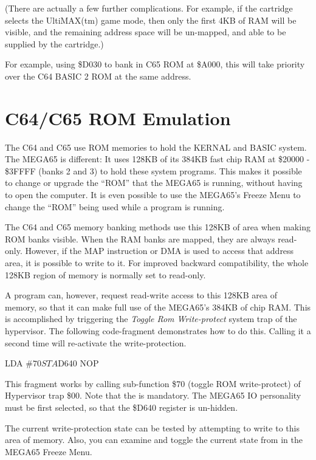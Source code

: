 (There are actually a few further complications. For example, if the
cartridge selects the UltiMAX(tm) game mode, then only the first 4KB
of RAM will be visible, and the remaining address space will be
un-mapped, and able to be supplied by the cartridge.)

For example, using \$D030 to bank in C65
ROM at \$A000, this will take priority over the C64 BASIC 2 ROM at the
same address.

\section{C64/C65 ROM Emulation}

The C64 and C65 use ROM memories to hold the KERNAL and BASIC system.
The MEGA65 is different: It uses 128KB of its 384KB fast chip RAM at
\$20000 - \$3FFFF (banks 2 and 3) to
hold these system programs. This makes it possible to change or upgrade the
``ROM'' that the MEGA65 is running, without having to open the
computer. It is even possible to use the MEGA65's Freeze Menu to
change the ``ROM'' being used while a program is running.

The C64 and C65 memory banking methods use this 128KB of area when
making ROM banks visible.  When the RAM banks are mapped, they are
always read-only.  However, if the MAP instruction or DMA is used to
access that address area, it is possible to write to it. For improved
backward compatibility, the whole 128KB region of memory is normally
set to read-only.

A program can, however, request read-write access to this
128KB area of memory, so that it can make full use of the MEGA65's
384KB of chip RAM.  This is accomplished by triggering the {\em Toggle
  Rom Write-protect} system trap of the hypervisor.  The following
code-fragment demonstrates how to do this. Calling it a second time
will re-activate the write-protection.

\begin{screenoutput}
  LDA #$70
  STA $D640
  NOP
\end{screenoutput}

This fragment works by
calling sub-function \$70 (toggle ROM write-protect) of Hypervisor
trap \$00. Note that the  is mandatory. The MEGA65
IO personality must be first selected, so that the \$D640 register is
un-hidden.

The current write-protection
state can be tested by attempting to write to this area of memory.
Also, you can examine and toggle the current state from in the MEGA65
Freeze Menu.

